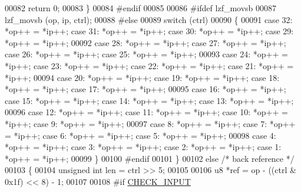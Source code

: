 \begin{DoxyCode}
00082               \textcolor{keywordflow}{return} 0;
00083             \}
00084 \textcolor{preprocessor}{#}\textcolor{preprocessor}{endif}
00085 
00086 \textcolor{preprocessor}{#}\textcolor{preprocessor}{ifdef} \textcolor{preprocessor}{lzf\_movsb}
00087           lzf\_movsb (op, ip, ctrl);
00088 \textcolor{preprocessor}{#}\textcolor{preprocessor}{else}
00089           \textcolor{keywordflow}{switch} (ctrl)
00090             \{
00091               \textcolor{keywordflow}{case} 32: *op++ = *ip++; \textcolor{keywordflow}{case} 31: *op++ = *ip++; \textcolor{keywordflow}{case} 30: *op++ = *ip++; \textcolor{keywordflow}{case} 29: *op++ =
       *ip++;
00092               \textcolor{keywordflow}{case} 28: *op++ = *ip++; \textcolor{keywordflow}{case} 27: *op++ = *ip++; \textcolor{keywordflow}{case} 26: *op++ = *ip++; \textcolor{keywordflow}{case} 25: *op++ =
       *ip++;
00093               \textcolor{keywordflow}{case} 24: *op++ = *ip++; \textcolor{keywordflow}{case} 23: *op++ = *ip++; \textcolor{keywordflow}{case} 22: *op++ = *ip++; \textcolor{keywordflow}{case} 21: *op++ =
       *ip++;
00094               \textcolor{keywordflow}{case} 20: *op++ = *ip++; \textcolor{keywordflow}{case} 19: *op++ = *ip++; \textcolor{keywordflow}{case} 18: *op++ = *ip++; \textcolor{keywordflow}{case} 17: *op++ =
       *ip++;
00095               \textcolor{keywordflow}{case} 16: *op++ = *ip++; \textcolor{keywordflow}{case} 15: *op++ = *ip++; \textcolor{keywordflow}{case} 14: *op++ = *ip++; \textcolor{keywordflow}{case} 13: *op++ =
       *ip++;
00096               \textcolor{keywordflow}{case} 12: *op++ = *ip++; \textcolor{keywordflow}{case} 11: *op++ = *ip++; \textcolor{keywordflow}{case} 10: *op++ = *ip++; \textcolor{keywordflow}{case}  9: *op++ =
       *ip++;
00097               \textcolor{keywordflow}{case}  8: *op++ = *ip++; \textcolor{keywordflow}{case}  7: *op++ = *ip++; \textcolor{keywordflow}{case}  6: *op++ = *ip++; \textcolor{keywordflow}{case}  5: *op++ =
       *ip++;
00098               \textcolor{keywordflow}{case}  4: *op++ = *ip++; \textcolor{keywordflow}{case}  3: *op++ = *ip++; \textcolor{keywordflow}{case}  2: *op++ = *ip++; \textcolor{keywordflow}{case}  1: *op++ =
       *ip++;
00099             \}
00100 \textcolor{preprocessor}{#}\textcolor{preprocessor}{endif}
00101         \}
00102       \textcolor{keywordflow}{else} \textcolor{comment}{/* back reference */}
00103         \{
00104           \textcolor{keywordtype}{unsigned} \textcolor{keywordtype}{int} len = ctrl >> 5;
00105 
00106           u8 *ref = op - ((ctrl & 0x1f) << 8) - 1;
00107 
00108 \textcolor{preprocessor}{#}\textcolor{preprocessor}{if} \hyperlink{lzfP_8h_a1a4fde3dbdd8e8f920a325f551fcfd94}{CHECK\_INPUT}

\end{DoxyCode}
